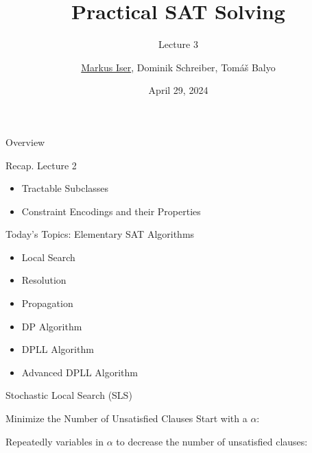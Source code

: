 \documentclass[t]{sdqbeamer}
\title[SAT Solving]{Practical SAT Solving}
\subtitle{Lecture 3}
\author{\underline{Markus Iser}, Dominik Schreiber, Tom\'a\v{s} Balyo}
\date{April 29, 2024}
\begin{document}
\begin{frame}
	\thispagestyle{empty}
	\titlepage
\end{frame}

\begin{frame}{Overview}
	\begin{block}{Recap. Lecture 2}
		\begin{itemize}\setlength{\itemsep}{1ex}
			\item Tractable Subclasses
			\item Constraint Encodings and their Properties
		\end{itemize}
	\end{block}
	\begin{block}{Today's Topics: Elementary SAT Algorithms}
		\begin{itemize}\setlength{\itemsep}{1ex}
			\item Local Search
			\item Resolution
			\item Propagation
			\item DP Algorithm
			\item DPLL Algorithm
			\item Advanced DPLL Algorithm
		\end{itemize}
	\end{block}
\end{frame}

\begin{frame}{Stochastic Local Search (SLS)}
\begin{block}{Minimize the Number of Unsatisfied Clauses}
	Start with a  $\alpha$:
	\begin{center}
	\end{center}
	Repeatedly  variables in $\alpha$ to decrease the number of unsatisfied clauses:
	\begin{center}
	\end{center}
\end{block}
\end{frame}
	
\end{document}
